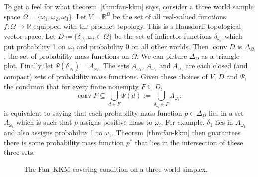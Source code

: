 \documentclass[11pt]{article}
\newcommand{\chg}[1]{{\color{red}#1}}
\theoremstyle{definition}
\theoremstyle{remark}
\begin{document}
To get a feel for what theorem~\ref{thm:fan-kkm} says, consider a three world sample space $\Omega=\{\omega_1,\omega_2,\omega_3\}$. Let $V=\mathbb R^{\Omega}$ be the set of all real-valued functions $f:\Omega\rightarrow\mathbb R$ equipped with the product topology. This is a Hausdorff topological vector space. Let $D\coloneqq\{\delta_{\omega_i}:\omega_i\in\Omega\}$ be the set of indicator functions $\delta_{\omega_i}$ which put probability 1 on $\omega_i$ and probability 0 on all other worlds. Then $\operatorname{conv}D$ is $\Delta_\Omega$, the set of probability mass functions on $\Omega$. We can picture $\Delta_\Omega$ as a triangle plot. Finally, let $\Psi(\delta_{\omega_i})=A_{\omega_i}$. The sets $A_{\omega_1}$, $A_{\omega_2}$ and $A_{\omega_3}$ are each closed (and compact) sets of probability mass functions. Given these choices of $V$, $D$ and $\Psi$, the condition that for every finite nonempty $F\subseteq D$,
\[
\operatorname{conv}F\subseteq\bigcup_{d\in F}\Psi(d):=\bigcup_{\delta_{\omega_i}\in F}A_{\omega_i},
\]
is equivalent to saying that each probability mass function $p\in\Delta_\Omega$ lies in a set $A_{\omega_i}$ which is such that $p$ assigns positive mass to $\omega_i$. For example, $\delta_1$ lies in $A_{\omega_1}$ and also assigns probability 1 to $\omega_1$. Theorem~\ref{thm:fan-kkm} then guarantees there is some probability mass function $p^*$ that lies in the intersection of these three sets.



\begin{figure}[ht]
\centering
{}
\caption{\chg{The Fan--KKM covering condition on a three-world simplex.}}
\label{fig:kkm}
\end{figure}
\end{document}
